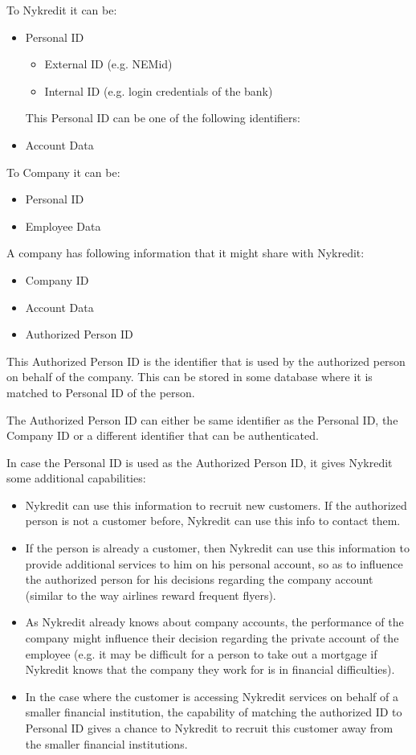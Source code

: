 To Nykredit it can be:
\begin{itemize}
\item Personal ID
\begin{itemize}
\item External ID (e.g. NEMid)
\item Internal ID (e.g. login credentials of the bank)
\end{itemize}

This Personal ID can be one of the following identifiers:
\item Account Data
\end{itemize}
To Company it can be:
\begin{itemize}
\item Personal ID
\item Employee Data
\end{itemize}

A company has following information that it might share with Nykredit:
\begin{itemize}
\item Company ID
\item Account Data
\item Authorized Person ID
\end{itemize}
This Authorized Person ID is the identifier that is used by the authorized person on behalf of the company. This can be stored in some database where it is matched to Personal ID of the person.

The Authorized Person ID can either be same identifier as the Personal ID, the Company ID or a different identifier that can be authenticated. 

In case the Personal ID is used as the Authorized Person ID, it gives Nykredit some additional capabilities:
\begin{itemize}
\item Nykredit can use this information to recruit new customers. If the authorized person is not a customer before, Nykredit can use this info to contact them.
\item If the person is already a customer, then Nykredit can use this information to provide additional services to him on his personal account, so as to influence the authorized person for his decisions regarding the company account (similar to the way airlines reward frequent flyers).
\item As Nykredit already knows about company accounts, the performance of the company might influence their decision regarding the private account of the employee (e.g. it may be difficult for a person to take out a mortgage if Nykredit knows that the company they work for is in financial difficulties).
\item In the case where the customer is accessing Nykredit services on behalf of a smaller financial institution, the capability of matching the authorized ID to Personal ID gives a chance to Nykredit to recruit this customer away from the smaller financial institutions.
\end{itemize}


